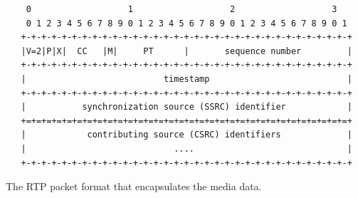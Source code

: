 
\begin{figure}[!t]
\begin{spacing}{0.5}
\centering
{\small
\begin{verbatim}
    0                   1                   2                   3
    0 1 2 3 4 5 6 7 8 9 0 1 2 3 4 5 6 7 8 9 0 1 2 3 4 5 6 7 8 9 0 1
   +-+-+-+-+-+-+-+-+-+-+-+-+-+-+-+-+-+-+-+-+-+-+-+-+-+-+-+-+-+-+-+-+
   |V=2|P|X|  CC   |M|     PT      |       sequence number         |
   +-+-+-+-+-+-+-+-+-+-+-+-+-+-+-+-+-+-+-+-+-+-+-+-+-+-+-+-+-+-+-+-+
   |                           timestamp                           |
   +-+-+-+-+-+-+-+-+-+-+-+-+-+-+-+-+-+-+-+-+-+-+-+-+-+-+-+-+-+-+-+-+
   |           synchronization source (SSRC) identifier            |
   +=+=+=+=+=+=+=+=+=+=+=+=+=+=+=+=+=+=+=+=+=+=+=+=+=+=+=+=+=+=+=+=+
   |            contributing source (CSRC) identifiers             |
   |                             ....                              |
   +-+-+-+-+-+-+-+-+-+-+-+-+-+-+-+-+-+-+-+-+-+-+-+-+-+-+-+-+-+-+-+-+
\end{verbatim}
}
\end{spacing}
\caption{The RTP packet format that encapsulates the media data.}
\label{fig:3:rtp.hdr}
\end{figure}


